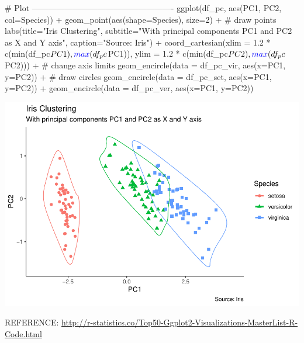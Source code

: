 \documentclass[a4paper]{article}
\newenvironment{Shaded}{}{}
\newcommand{\KeywordTok}[1]{\textcolor[rgb]{0.00,0.00,1.00}{#1}}
\newcommand{\DataTypeTok}[1]{#1}
\newcommand{\DecValTok}[1]{#1}
\newcommand{\FloatTok}[1]{#1}
\newcommand{\StringTok}[1]{\textcolor[rgb]{0.00,0.50,0.50}{#1}}
\newcommand{\CommentTok}[1]{\textcolor[rgb]{0.00,0.50,0.00}{#1}}
\newcommand{\OperatorTok}[1]{#1}
\newcommand{\NormalTok}[1]{#1}
\begin{document}
\begin{Shaded}
\begin{Highlighting}[]
\CommentTok{# Plot ----------------------------------------------------}
\KeywordTok{ggplot}\NormalTok{(df_pc, }\KeywordTok{aes}\NormalTok{(PC1, PC2, }\DataTypeTok{col=}\NormalTok{Species)) }\OperatorTok{+}\StringTok{ }
\StringTok{  }\KeywordTok{geom_point}\NormalTok{(}\KeywordTok{aes}\NormalTok{(}\DataTypeTok{shape=}\NormalTok{Species), }\DataTypeTok{size=}\DecValTok{2}\NormalTok{) }\OperatorTok{+}\StringTok{   }\CommentTok{# draw points}
\StringTok{  }\KeywordTok{labs}\NormalTok{(}\DataTypeTok{title=}\StringTok{"Iris Clustering"}\NormalTok{, }
       \DataTypeTok{subtitle=}\StringTok{"With principal components PC1 and PC2 as X and Y axis"}\NormalTok{,}
       \DataTypeTok{caption=}\StringTok{"Source: Iris"}\NormalTok{) }\OperatorTok{+}\StringTok{ }
\StringTok{  }\KeywordTok{coord_cartesian}\NormalTok{(}\DataTypeTok{xlim =} \FloatTok{1.2} \OperatorTok{*}\StringTok{ }\KeywordTok{c}\NormalTok{(}\KeywordTok{min}\NormalTok{(df_pc}\OperatorTok{$}\NormalTok{PC1), }\KeywordTok{max}\NormalTok{(df_pc}\OperatorTok{$}\NormalTok{PC1)), }
                  \DataTypeTok{ylim =} \FloatTok{1.2} \OperatorTok{*}\StringTok{ }\KeywordTok{c}\NormalTok{(}\KeywordTok{min}\NormalTok{(df_pc}\OperatorTok{$}\NormalTok{PC2), }\KeywordTok{max}\NormalTok{(df_pc}\OperatorTok{$}\NormalTok{PC2))) }\OperatorTok{+}\StringTok{   }\CommentTok{# change axis limits}
\StringTok{  }\KeywordTok{geom_encircle}\NormalTok{(}\DataTypeTok{data =}\NormalTok{ df_pc_vir, }\KeywordTok{aes}\NormalTok{(}\DataTypeTok{x=}\NormalTok{PC1, }\DataTypeTok{y=}\NormalTok{PC2)) }\OperatorTok{+}\StringTok{   }\CommentTok{# draw circles}
\StringTok{  }\KeywordTok{geom_encircle}\NormalTok{(}\DataTypeTok{data =}\NormalTok{ df_pc_set, }\KeywordTok{aes}\NormalTok{(}\DataTypeTok{x=}\NormalTok{PC1, }\DataTypeTok{y=}\NormalTok{PC2)) }\OperatorTok{+}\StringTok{ }
\StringTok{  }\KeywordTok{geom_encircle}\NormalTok{(}\DataTypeTok{data =}\NormalTok{ df_pc_ver, }\KeywordTok{aes}\NormalTok{(}\DataTypeTok{x=}\NormalTok{PC1, }\DataTypeTok{y=}\NormalTok{PC2))}
\end{Highlighting}
\end{Shaded}

\includegraphics{M24-ggplot2_Gallery_files/figure-latex/unnamed-chunk-55-1.pdf}

REFERENCE:
\url{http://r-statistics.co/Top50-Ggplot2-Visualizations-MasterList-R-Code.html}
\end{document}
